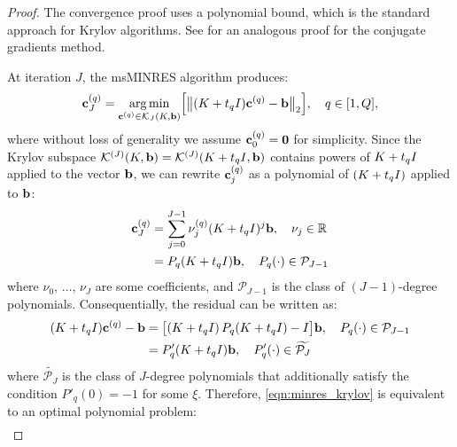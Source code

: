 \begin{proof}
  The convergence proof uses a polynomial bound, which is the standard approach for Krylov algorithms.
  See \citep[e.g.][]{shewchuk1994introduction,trefethen1997numerical,saad2003iterative} for an analogous proof for the conjugate gradients method.

	At iteration $J$, the msMINRES algorithm produces:
	\begin{align}
    \mathbf{c}^{(q)}_J
    = \operatorname*{arg\,min}_{\mathbf{c}^{(q)} \in \mathcal{K}_J(K, \mathbf{b})} \Bigl[
      \bigl\Vert (K + t_q I) \mathbf{c}^{(q)} - \mathbf{b} \bigr\Vert_2
    \Bigr],
    \quad
    q \in [1, Q],
    \label{eqn:minres_krylov}
	\end{align}
  where without loss of generality we assume $\mathbf{c}_0^{(q)} = \mathbf{0}$ for simplicity.
  Since the Krylov subspace $\mathcal{K}^{(J)} (K, \mathbf{b}) = \mathcal{K}^{(J)} (K + t_q I, \mathbf{b})$ contains powers of $K + t_q I$ applied to the vector $\mathbf{b}$, we can rewrite
  $\mathbf{c}_j^{(q)}$
  as a polynomial of $(K + t_q I)$ applied to $\mathbf{b}$:
  \begin{align*}
    \mathbf{c}^{(q)}_J
    &= \sum_{j=0}^{J-1} \nu_j^{(q)} (K + t_q I)^j \mathbf{b}, \quad \nu_j \in \mathbb{R}
    \\
    &= P_q(K + t_q I) \mathbf{b}, \quad P_q(\cdot) \in \mathcal{P}_{J-1}
  \end{align*}
  where $\nu_0$, $\ldots$, $\nu_J$ are some coefficients,
  and $\mathcal{P}_{J-1}$ is the class of $(J-1)$-degree polynomials.
  Consequentially, the residual can be written as:
  \begin{align}
    (K + t_q I) \mathbf{c}^{(q)} - \mathbf{b}
    &= \bigl[ \left( K + t_q I \right) P_q(K + t_q I) - I \bigr] \mathbf{b}, \quad P_q(\cdot) \in \mathcal{P}_{J-1}
    \nonumber
    \\
    &= P'_q(K + t_q I) \mathbf{b}, \quad P'_q(\cdot) \in \widetilde{\mathcal{P}_J}
    \nonumber
  \end{align}
  where $\widetilde{\mathcal{P}_J}$ is the class of $J$-degree polynomials that additionally satisfy the condition $P'_q(0) = -1$ for some $\xi$.
  Therefore, \cref{eqn:minres_krylov} is equivalent to an optimal polynomial problem:
	\begin{align}

\end{align}
\end{proof}
